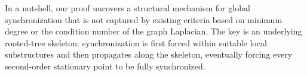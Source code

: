 \documentclass[11pt,reqno]{amsart}
\theoremstyle{definition}
\begin{document}










In a nutshell, our proof uncovers a structural mechanism for global synchronization that is not captured by existing criteria based on minimum degree or the condition number of the graph Laplacian. The key is an underlying rooted-tree skeleton: synchronization is first forced within suitable local substructures and then propagates along the skeleton, eventually forcing every second-order stationary point to be fully synchronized.
\end{document}
